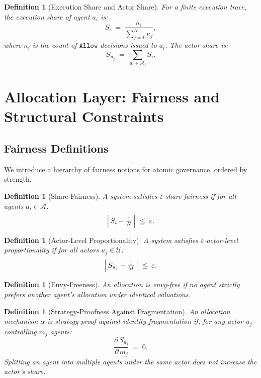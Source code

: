 \documentclass[11pt]{article}
\newtheorem{definition}[theorem]{Definition}
\newcommand{\allow}{\texttt{Allow}}
\newcommand{\Agents}{\mathcal{A}}
\newcommand{\Actors}{\mathcal{U}}
\newcommand{\Share}[1]{S_{#1}}
\begin{document}
\begin{definition}[Execution Share and Actor Share]
\label{def:shares}
For a finite execution trace, the \emph{execution share} of agent $a_i$ is:
\[
  \Share{i} \;=\; \frac{\kappa_i}{\sum_{j=1}^{N} \kappa_j},
\]
where $\kappa_i$ is the count of $\allow$ decisions issued to $a_i$. The \emph{actor share} is:
\[
  \Share{u_j} \;=\; \sum_{a_i \in \Agents_j} \Share{i}.
\]
\end{definition}

\section{Allocation Layer: Fairness and Structural Constraints}
\label{sec:allocation}

\subsection{Fairness Definitions}

We introduce a hierarchy of fairness notions for atomic governance, ordered by strength.

\begin{definition}[Share Fairness]
\label{def:share-fair}
A system satisfies \emph{$\varepsilon$-share fairness} if for all agents $a_i \in \Agents$:
\[
  \Bigl|\,\Share{i} - \tfrac{1}{N}\,\Bigr| \;\leq\; \varepsilon.
\]
\end{definition}

\begin{definition}[Actor-Level Proportionality]
\label{def:actor-fair}
A system satisfies \emph{$\varepsilon$-actor-level proportionality} if for all actors $u_j \in \Actors$:
\[
  \Bigl|\,\Share{u_j} - \tfrac{1}{M}\,\Bigr| \;\leq\; \varepsilon.
\]
\end{definition}

\begin{definition}[Envy-Freeness]
\label{def:envy}
An allocation is \emph{envy-free} if no agent strictly prefers another agent's allocation under identical valuations.
\end{definition}

\begin{definition}[Strategy-Proofness Against Fragmentation]
\label{def:strategy-proof}
An allocation mechanism $\alpha$ is \emph{strategy-proof against identity fragmentation} if, for any actor $u_j$ controlling $m_j$ agents:
\[
  \frac{\partial\, \Share{u_j}}{\partial\, m_j} \;=\; 0.
\]
Splitting an agent into multiple agents under the same actor does not increase the actor's share.
\end{definition}
\end{document}
